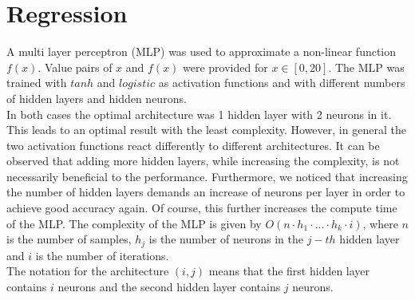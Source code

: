 \documentclass[DIV=12, ngerman, fontsize=12pt, parskip=half]{scrreprt}
\begin{document}
	\section{Regression}
	A multi layer perceptron (MLP) was used to approximate a non-linear function $f(x)$. Value pairs of $x$ and $f(x)$ were provided for $x\in [0,20]$. The MLP was trained with $tanh$ and $logistic$ as activation functions and with different numbers of hidden layers and hidden neurons. \\
	In both cases the optimal architecture was 1 hidden layer with 2 neurons in it. This leads to an optimal result with the least complexity. However, in general the two activation functions react differently to different architectures. It can be observed that adding more hidden layers, while increasing the complexity, is not necessarily beneficial to the performance. Furthermore, we noticed that increasing the number of hidden layers demands an increase of neurons per layer in order to achieve good accuracy again. Of course, this further increases the compute time of the MLP. The complexity of the MLP is given by $O(n\cdot h_1\cdot ...\cdot h_k\cdot i)$, where $n$ is the number of samples, $h_j$ is the number of neurons in the $j-th$ hidden layer and $i$ is the number of iterations. \\
	The notation for the architecture $(i,j)$ means that the first hidden layer contains $i$ neurons and the second hidden layer contains $j$ neurons.
	
\end{document}
